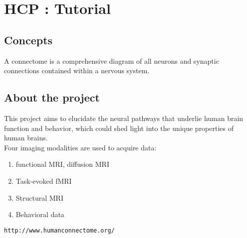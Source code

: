 
\section{HCP : Tutorial } 
\label{section:HCP} 

\subsection{Concepts}
A connectome is a comprehensive diagram of all neurons and synaptic connections contained within a nervous system.

\subsection{About the project}
This project aims to elucidate the neural pathways that underlie human brain function and behavior, which could shed light into the unique properties of human brains.
\\
Four imaging modalities are used to acquire data:
\begin{enumerate}
  \item functional MRI, diffusion MRI
  \item Task-evoked fMRI
  \item Structural MRI
  \item Behavioral data
\end{enumerate}

{\tt http://www.humanconnectome.org/   } 
